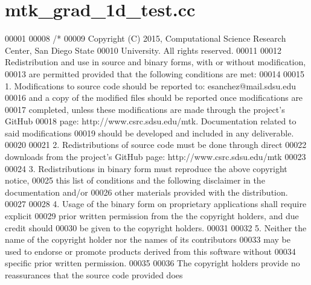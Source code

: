 \hypertarget{mtk__grad__1d__test_8cc_source}{\section{mtk\+\_\+grad\+\_\+1d\+\_\+test.\+cc}
\label{mtk__grad__1d__test_8cc_source}
}

\begin{DoxyCode}
00001 
00008 \textcolor{comment}{/*}
00009 \textcolor{comment}{Copyright (C) 2015, Computational Science Research Center, San Diego State}
00010 \textcolor{comment}{University. All rights reserved.}
00011 \textcolor{comment}{}
00012 \textcolor{comment}{Redistribution and use in source and binary forms, with or without modification,}
00013 \textcolor{comment}{are permitted provided that the following conditions are met:}
00014 \textcolor{comment}{}
00015 \textcolor{comment}{1. Modifications to source code should be reported to: esanchez@mail.sdsu.edu}
00016 \textcolor{comment}{and a copy of the modified files should be reported once modifications are}
00017 \textcolor{comment}{completed, unless these modifications are made through the project's GitHub}
00018 \textcolor{comment}{page: http://www.csrc.sdsu.edu/mtk. Documentation related to said modifications}
00019 \textcolor{comment}{should be developed and included in any deliverable.}
00020 \textcolor{comment}{}
00021 \textcolor{comment}{2. Redistributions of source code must be done through direct}
00022 \textcolor{comment}{downloads from the project's GitHub page: http://www.csrc.sdsu.edu/mtk}
00023 \textcolor{comment}{}
00024 \textcolor{comment}{3. Redistributions in binary form must reproduce the above copyright notice,}
00025 \textcolor{comment}{this list of conditions and the following disclaimer in the documentation and/or}
00026 \textcolor{comment}{other materials provided with the distribution.}
00027 \textcolor{comment}{}
00028 \textcolor{comment}{4. Usage of the binary form on proprietary applications shall require explicit}
00029 \textcolor{comment}{prior written permission from the the copyright holders, and due credit should}
00030 \textcolor{comment}{be given to the copyright holders.}
00031 \textcolor{comment}{}
00032 \textcolor{comment}{5. Neither the name of the copyright holder nor the names of its contributors}
00033 \textcolor{comment}{may be used to endorse or promote products derived from this software without}
00034 \textcolor{comment}{specific prior written permission.}
00035 \textcolor{comment}{}
00036 \textcolor{comment}{The copyright holders provide no reassurances that the source code provided does}

\end{DoxyCode}
